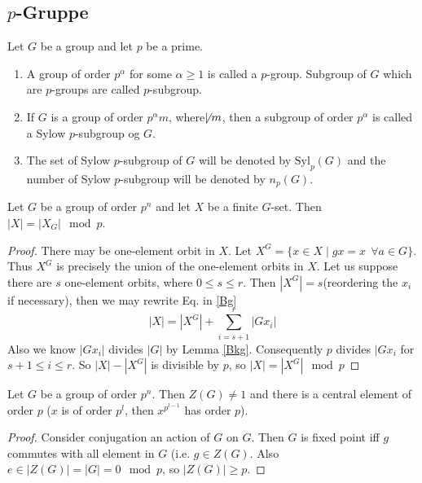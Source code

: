 \subsection{\(p\)-Gruppe}
\begin{definition}[\(p\)-group]
    Let \(G\) be a group and let \(p\) be a prime.
    \begin{enumerate}
        \item A group of order \(p^\alpha\) for some \(\alpha \geq 1\) is called a \(p\)-group. Subgroup of \(G\) which are \(p\)-groups are called \(p\)-subgroup.
        \item If \(G\) is a group of order \(p^\alpha m\), where\(\not\mid m\), then a subgroup of order \(p^\alpha\) is called a Sylow \(p\)-subgroup og \(G\).
        \item The set of Sylow \(p\)-subgroup of \(G\) will be denoted by \(\mathrm{Syl}_p(G)\) and the number of Sylow \(p\)-subgroup will be denoted by \(n_p(G)\). 
    \end{enumerate}
\end{definition}

\begin{lemma}
    Let \(G\) be a group of order \(p^n\) and let \(X\) be a finite \(G\)-set. Then \(|X| =|X_G|\mod p\).
\end{lemma}
\begin{proof}
    There may be one-element orbit in \(X\). Let \(X^G = \{x\in X\mid gx = x\ \ \forall a\in G\}\). Thus \(X^G\) is precisely the union of the one-element orbits in \(X\). Let us suppose there are \(s\) one-element orbits, where \(0\leq s\leq r\). Then \(|X^G| = s\)(reordering the \(x_i\) if necessary), then we may rewrite Eq. in \ref{Bg}\[|X| = |X^G| + \sum_{i = s+1}^r |G{x_i}|\]
    Also we know \(|Gx_i|\) divides \(|G|\) by Lemma \ref{Bkg}. Consequently \(p\) divides \(|Gx_i\) for \(s+1\leq i \leq r\). So \(|X|-|X^G|\) is divisible by \(p\), so \(|X|=|X^G|\mod p\)
\end{proof}

\begin{theorem}\label{centerbig}
    Let \(G\) be a group of order \(p^n\). Then \(Z(G) \not =1\) and there is a central element of order \(p\) (\(x\) is of order \(p^l\), then \(x^{p^{l-1}}\) has order \(p\)).
\end{theorem}
\begin{proof}
    Consider conjugation an action of \(G\) on \(G\). Then \(G\) is fixed point iff \(g\) commutes with all element in \(G\) (i.e. \(g\in Z(G)\). Also \(e\in |Z(G)| = |G| = 0 \mod p \), so \(|Z(G)| \geq p\). 
\end{proof}

